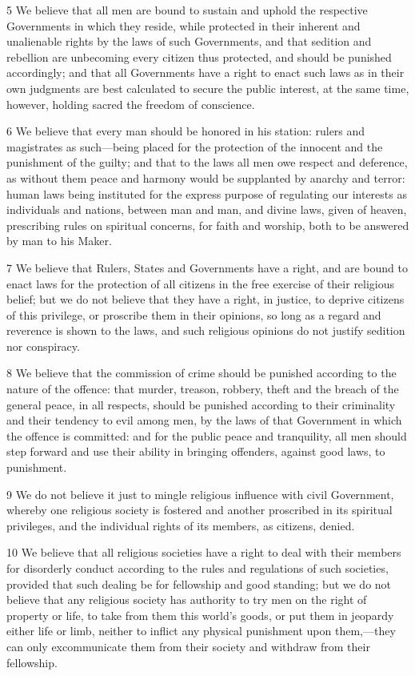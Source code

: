 				5 We believe that all men are bound to sustain and uphold the respective Governments in which they reside, while protected in their inherent and unalienable rights by the laws of such Governments, and that sedition and rebellion are unbecoming every citizen thus protected, and should be punished accordingly; and that all Governments have a right to enact such laws as in their own judgments are best calculated to secure the public interest, at the same time, however, holding sacred the freedom of conscience.

				6 We believe that every man should be honored in his station: rulers and magistrates as such—being placed for the protection of the innocent and the punishment of the guilty; and that to the laws all men owe respect and deference, as without them peace and harmony would be supplanted by anarchy and terror: human laws being instituted for the express purpose of regulating our interests as individuals and nations, between man and man, and divine laws, given of heaven, prescribing rules on spiritual concerns, for faith and worship, both to be answered by man to his Maker.

				7 We believe that Rulers, States and Governments have a right, and are bound to enact laws for the protection of all citizens in the free exercise of their religious belief; but we do not believe that they have a right, in justice, to deprive citizens of this privilege, or proscribe them in their opinions, so long as a regard and reverence is shown to the laws, and such religious opinions do not justify sedition nor conspiracy.

				8 We believe that the commission of crime should be punished according to the nature of the offence: that murder, treason, robbery, theft and the breach of the general peace, in all respects, should be punished according to their criminality and their tendency to evil among men, by the laws of that Government in which the offence is committed: and for the public peace and tranquility, all men should step forward and use their ability in bringing offenders, against good laws, to punishment.

				9 We do not believe it just to mingle religious influence with civil Government, whereby one religious society is fostered and another proscribed in its spiritual privileges, and the individual rights of its members, as citizens, denied.

				10 We believe that all religious societies have a right to deal with their members for disorderly conduct according to the rules and regulations of such societies, provided that such dealing be for fellowship and good standing; but we do not believe that any religious society has authority to try men on the right of property or life, to take from them this world's goods, or put them in jeopardy either life or limb, neither to inflict any physical punishment upon them,—they can only excommunicate them from their society and withdraw from their fellowship.

